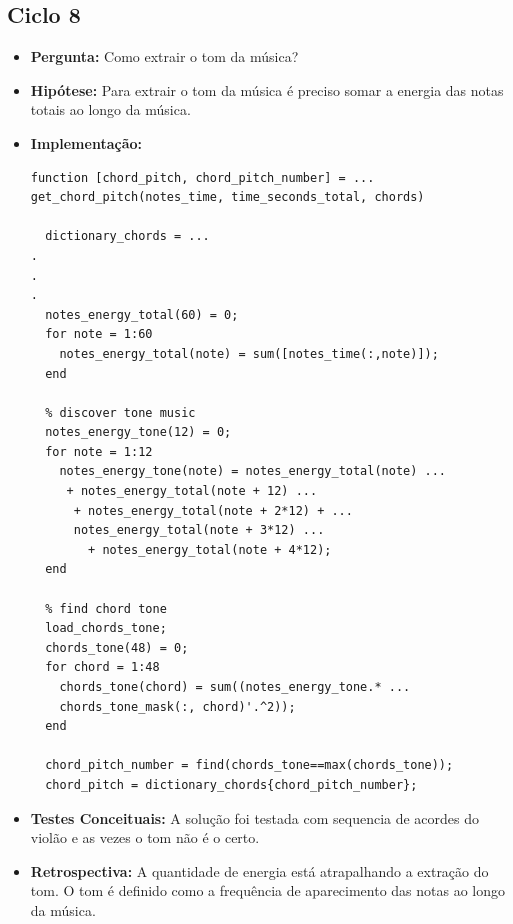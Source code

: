 \subsection{Ciclo 8}
\label{subsec:ciclo_8}
\begin{itemize}
\item \textbf{Pergunta:} Como extrair o tom da música?
\item \textbf{Hipótese:} Para extrair o tom da música é preciso somar a energia das notas totais ao longo da música.
\item \textbf{Implementação:} 
\begin{lstlisting}
function [chord_pitch, chord_pitch_number] = ...
get_chord_pitch(notes_time, time_seconds_total, chords)
  
  dictionary_chords = ...
.
.
.
  notes_energy_total(60) = 0;
  for note = 1:60
    notes_energy_total(note) = sum([notes_time(:,note)]);
  end

  % discover tone music
  notes_energy_tone(12) = 0;
  for note = 1:12
    notes_energy_tone(note) = notes_energy_total(note) ...
     + notes_energy_total(note + 12) ...
      + notes_energy_total(note + 2*12) + ...
      notes_energy_total(note + 3*12) ...
        + notes_energy_total(note + 4*12);
  end

  % find chord tone
  load_chords_tone;
  chords_tone(48) = 0;
  for chord = 1:48
    chords_tone(chord) = sum((notes_energy_tone.* ...
    chords_tone_mask(:, chord)'.^2));
  end

  chord_pitch_number = find(chords_tone==max(chords_tone));
  chord_pitch = dictionary_chords{chord_pitch_number};
\end{lstlisting}
\item \textbf{Testes Conceituais:} A solução foi testada com sequencia de acordes do violão e as vezes o tom não é o certo.
\item \textbf{Retrospectiva:} A quantidade de energia está atrapalhando a extração do tom. O tom é definido como a frequência de aparecimento das notas ao longo da música.
\end{itemize}

